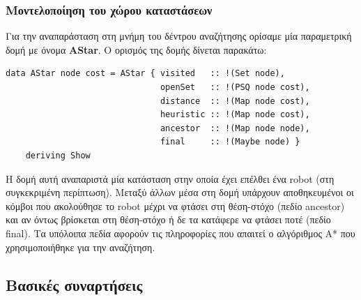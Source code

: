 \documentclass[12pt]{article}
\begin{document}
\subsubsection{Μοντελοποίηση του χώρου καταστάσεων}
Για την αναπαράσταση στη μνήμη του δέντρου αναζήτησης ορίσαμε μία παραμετρική δομή με όνομα \textbf{AStar}. Ο ορισμός της δομής δίνεται παρακάτω:
\begin{verbatim}
data AStar node cost = AStar { visited   :: !(Set node),
                               openSet   :: !(PSQ node cost),
                               distance  :: !(Map node cost),
                               heuristic :: !(Map node cost),
                               ancestor  :: !(Map node node),
                               final     :: !(Maybe node) }
    deriving Show
\end{verbatim}
Η δομή αυτή αναπαριστά μία κατάσταση στην οποία έχει επέλθει ένα robot (στη συγκεκριμένη περίπτωση). Μεταξύ άλλων μέσα στη δομή υπάρχουν αποθηκευμένοι οι κόμβοι που ακολούθησε το robot μέχρι να φτάσει στη θέση-στόχο (πεδίο ancestor) και αν όντως βρίσκεται στη θέση-στόχο ή δε τα κατάφερε να φτάσει ποτέ (πεδίο final). Τα υπόλοιπα πεδία αφορούν τις πληροφορίες που απαιτεί ο αλγόριθμος A* που χρησιμοποιήθηκε για την αναζήτηση.
\subsection{Βασικές συναρτήσεις}
\end{document}
